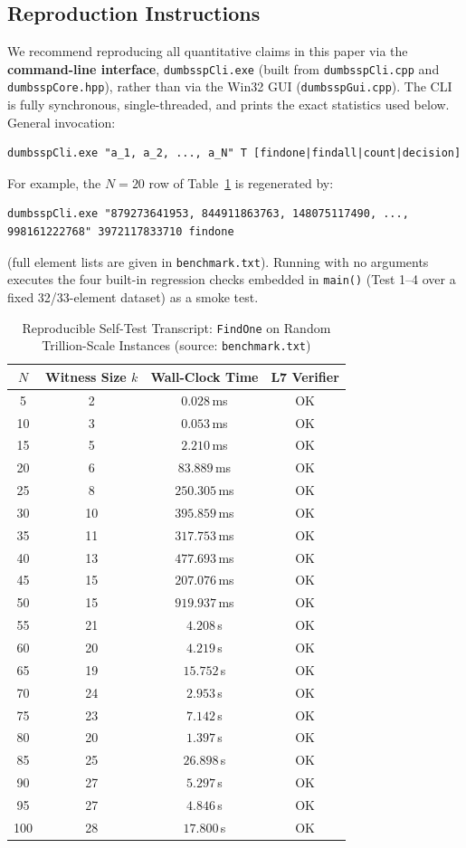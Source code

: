 \documentclass[journal,onecolumn,11pt]{IEEEtran}
\begin{document}
\subsection{Reproduction Instructions}
\label{sec:repro}
We recommend reproducing all quantitative claims in this paper via the \textbf{command-line interface}, \texttt{dumbsspCli.exe} (built from \texttt{dumbsspCli.cpp} and \texttt{dumbsspCore.hpp}), rather than via the Win32 GUI (\texttt{dumbsspGui.cpp}). The CLI is fully synchronous, single-threaded, and prints the exact statistics used below. General invocation:
\begin{verbatim}
dumbsspCli.exe "a_1, a_2, ..., a_N" T [findone|findall|count|decision]
\end{verbatim}
For example, the $N=20$ row of Table~\ref{tab:selftest} is regenerated by:
\begin{verbatim}
dumbsspCli.exe "879273641953, 844911863763, 148075117490, ...,
998161222768" 3972117833710 findone
\end{verbatim}
(full element lists are given in \texttt{benchmark.txt}). Running with no arguments executes the four built-in regression checks embedded in \texttt{main()} (Test 1--4 over a fixed 32/33-element dataset) as a smoke test.

\begin{table}[h]
\centering
\caption{Reproducible Self-Test Transcript: \texttt{FindOne} on Random Trillion-Scale Instances (source: \texttt{benchmark.txt})}
\label{tab:selftest}
\renewcommand{\arraystretch}{1.1}
\begin{tabular}{cccc}
\hline
$N$ & Witness Size $k$ & Wall-Clock Time & L7 Verifier \\
\hline
5   & 2  & $0.028$\,ms  & OK \\
10  & 3  & $0.053$\,ms  & OK \\
15  & 5  & $2.210$\,ms  & OK \\
20  & 6  & $83.889$\,ms & OK \\
25  & 8  & $250.305$\,ms & OK \\
30  & 10 & $395.859$\,ms & OK \\
35  & 11 & $317.753$\,ms & OK \\
40  & 13 & $477.693$\,ms & OK \\
45  & 15 & $207.076$\,ms & OK \\
50  & 15 & $919.937$\,ms & OK \\
55  & 21 & $4.208$\,s   & OK \\
60  & 20 & $4.219$\,s   & OK \\
65  & 19 & $15.752$\,s  & OK \\
70  & 24 & $2.953$\,s   & OK \\
75  & 23 & $7.142$\,s   & OK \\
80  & 20 & $1.397$\,s   & OK \\
85  & 25 & $26.898$\,s  & OK \\
90  & 27 & $5.297$\,s   & OK \\
95  & 27 & $4.846$\,s   & OK \\
100 & 28 & $17.800$\,s  & OK \\
\hline
\end{tabular}
\end{table}
\end{document}
